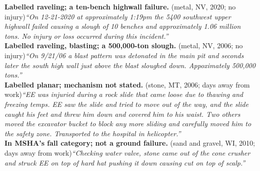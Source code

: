 \textbf{Labelled raveling; a ten-bench highwall failure.} (metal, NV, 2020; no injury)\newline \textit{``On 12-21-2020 at approximately 1:19pm the 5400 southwest upper highwall failed causing a slough of 10 benches and approximately 1.06 million tons.  No injury or loss occurred during this incident.''} \\
\midrule
\textbf{Labelled raveling, blasting; a 500,000-ton slough.} (metal, NV, 2006; no injury)\newline \textit{``On 9/21/06 a blast pattern was detonated in the main pit and seconds later the south high wall just above the blast sloughed down.  Appoximately 500,000 tons.''} \\
\midrule
\textbf{Labelled planar; mechanism not stated.} (stone, MT, 2006; days away from work)\newline \textit{``EE was injuried during a rock slide that came loose due to thawing and freezing temps. EE saw the slide and tried to move out of the way, and the slide caught his feet and threw him down and covered him to his waist. Two others moved the excavator bucket to block any more sliding and carefully moved him to the safety zone.  Transported to the hospital in helicopter.''} \\
\midrule
\textbf{In MSHA's fall category; not a ground failure.} (sand and gravel, WI, 2010; days away from work)\newline \textit{``Checking water valve, stone came out of the cone crusher and struck EE on top of hard hat pushing it down causing cut on top of scalp.''} \\
